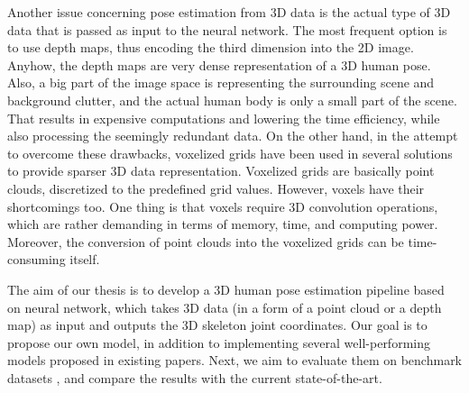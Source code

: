 \vspace{5mm}
\noindent Another issue concerning pose estimation from 3D data is the actual type of 3D data that is passed as input to the neural network. The most frequent option is to use depth maps, thus encoding the third dimension into the 2D image. Anyhow, the depth maps are very dense representation of a 3D human pose. Also, a big part of the image space is representing the surrounding scene and background clutter, and the actual human body is only a small part of the scene. That results in expensive computations and lowering the time efficiency, while also processing the seemingly redundant data. On the other hand, in the attempt to overcome these drawbacks, voxelized grids have been used in several solutions to provide sparser 3D data representation. Voxelized grids are basically point clouds, discretized to the predefined grid values. However, voxels have their shortcomings too. One thing is that voxels require 3D convolution operations, which are rather demanding in terms of memory, time, and computing power. Moreover, the conversion of point clouds into the voxelized grids can be time-consuming itself.\par
\vspace{5mm}
\noindent The aim of our thesis is to develop a 3D human pose estimation pipeline based on neural network, which takes 3D data (in a form of a point cloud or a depth map) as input and outputs the 3D skeleton joint coordinates. %
Our goal is to propose our own model, in addition to implementing several well-performing models proposed in existing papers. Next, we aim to evaluate them on %
benchmark datasets%
, and compare the results with the current state-of-the-art.\par